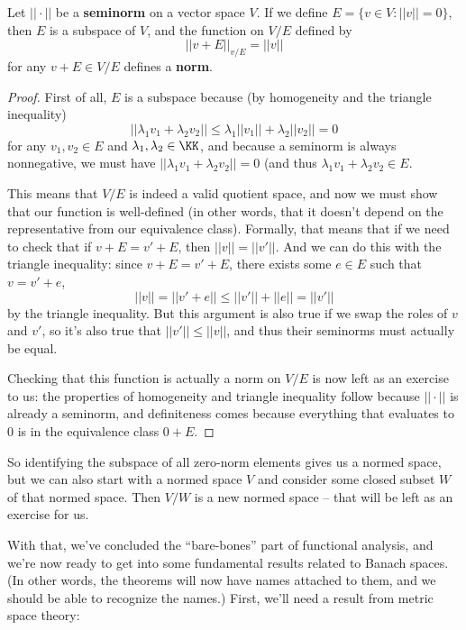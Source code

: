 \begin{theorem}
Let $||\cdot||$ be a \textbf{seminorm} on a vector space $V$. If we define $E = \{v \in V: ||v|| = 0\}$, then $E$ is a subspace of $V$, and the function on $V/E$ defined by
\[
    ||v+E||_{v/E} = ||v||
\]
for any $v + E \in V/E$ defines a \textbf{norm}. 
\end{theorem}
\begin{proof}
First of all, $E$ is a subspace because (by homogeneity and the triangle inequality)
\[
    ||\lambda_1 v_1 + \lambda_2 v_2 || \le \lambda_1 ||v_1|| + \lambda_2 ||v_2|| = 0
\]
for any $v_1, v_2 \in E$ and $\lambda_1, \lambda_2 \in \KK$, and because a seminorm is always nonnegative, we must have $||\lambda_1v_1 + \lambda_2v_2|| = 0$ (and thus $\lambda_1 v_1 + \lambda_2 v_2 \in E$.

This means that $V/E$ is indeed a valid quotient space, and now we must show that our function is well-defined (in other words, that it doesn't depend on the representative from our equivalence class). Formally, that means that if we need to check that if $v + E = v' + E$, then $||v|| = ||v'||$. And we can do this with the triangle inequality: since $v + E = v' + E$, there exists some $e \in E$ such that $v = v' + e$, 
\[
    ||v|| = ||v' + e|| \le ||v'|| + ||e|| = ||v'||
\]
by the triangle inequality. But this argument is also true if we swap the roles of $v$ and $v'$, so it's also true that $||v'|| \le ||v||$, and thus their seminorms must actually be equal. 

Checking that this function is actually a norm on $V/E$ is now left as an exercise to us: the properties of homogeneity and triangle inequality follow because $||\cdot||$ is already a seminorm, and definiteness comes because everything that evaluates to $0$ is in the equivalence class $0 + E$.
\end{proof}

So identifying the subspace of all zero-norm elements gives us a normed space, but we can also start with a normed space $V$ and consider some closed subset $W$ of that normed space. Then $V/W$ is a new normed space -- that will be left as an exercise for us. 

With that, we've concluded the ``bare-bones'' part of functional analysis, and we're now ready to get into some fundamental results related to Banach spaces. (In other words, the theorems will now have names attached to them, and we should be able to recognize the names.) First, we'll need a result from metric space theory:

